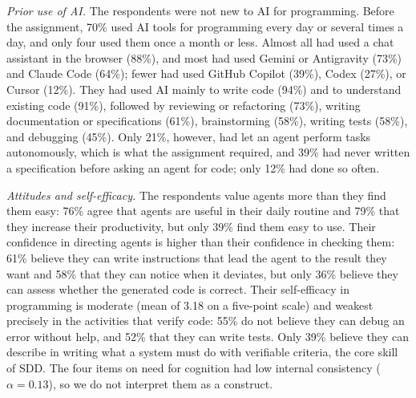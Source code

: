 \documentclass[conference]{IEEEtran}
\begin{document}
\emph{Prior use of AI.} The respondents were not new to AI for programming. Before the assignment, 70\% used AI tools for programming every day or several times a day, and only four used them once a month or less. Almost all had used a chat assistant in the browser (88\%), and most had used Gemini or Antigravity (73\%) and Claude Code (64\%); fewer had used GitHub Copilot (39\%), Codex (27\%), or Cursor (12\%). They had used AI mainly to write code (94\%) and to understand existing code (91\%), followed by reviewing or refactoring (73\%), writing documentation or specifications (61\%), brainstorming (58\%), writing tests (58\%), and debugging (45\%). Only 21\%, however, had let an agent perform tasks autonomously, which is what the assignment required, and 39\% had never written a specification before asking an agent for code; only 12\% had done so often.

\emph{Attitudes and self-efficacy.} The respondents value agents more than they find them easy: 76\% agree that agents are useful in their daily routine and 79\% that they increase their productivity, but only 39\% find them easy to use. Their confidence in directing agents is higher than their confidence in checking them: 61\% believe they can write instructions that lead the agent to the result they want and 58\% that they can notice when it deviates, but only 36\% believe they can assess whether the generated code is correct. Their self-efficacy in programming is moderate (mean of 3.18 on a five-point scale) and weakest precisely in the activities that verify code: 55\% do not believe they can debug an error without help, and 52\% that they can write tests. Only 39\% believe they can describe in writing what a system must do with verifiable criteria, the core skill of SDD. The four items on need for cognition had low internal consistency ($\alpha = 0.13$), so we do not interpret them as a construct.
\end{document}
